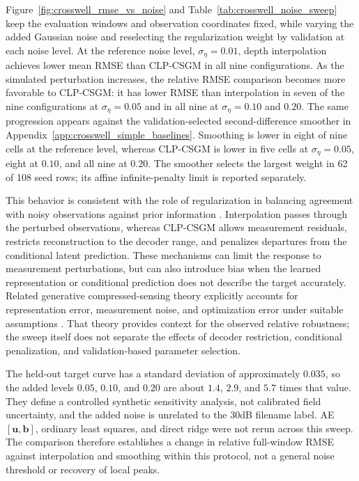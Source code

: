 Figure~\ref{fig:crosswell_rmse_vs_noise} and
Table~\ref{tab:crosswell_noise_sweep} keep the evaluation windows and
observation coordinates fixed, while varying the added Gaussian noise and
reselecting the regularization weight by validation at each noise level.
At the reference noise level, $\sigma_\eta=0.01$, depth interpolation
achieves lower mean RMSE than CLP-CSGM in all nine configurations. As the
simulated perturbation increases, the relative RMSE comparison becomes more
favorable to CLP-CSGM: it has lower RMSE than interpolation in seven of the
nine configurations at $\sigma_\eta=0.05$ and in all nine at
$\sigma_\eta=0.10$ and $0.20$.
The same progression appears against the validation-selected
second-difference smoother in
Appendix~\ref{app:crosswell_simple_baselines}. Smoothing is lower in eight of
nine cells at the reference level, whereas CLP-CSGM is lower in five cells
at $\sigma_\eta=0.05$, eight at $0.10$, and all nine at $0.20$. The
smoother selects the largest weight in 62 of 108 seed rows; its affine
infinite-penalty limit is reported separately.

This behavior is consistent with the role of regularization in balancing
agreement with noisy observations against prior information
\cite{hansen2010discrete}. Interpolation passes through the perturbed
observations, whereas CLP-CSGM allows measurement residuals, restricts
reconstruction to the decoder range, and penalizes departures from the
conditional latent prediction. These mechanisms can limit the response to
measurement perturbations, but can also introduce bias when the learned
representation or conditional prediction does not describe the target
accurately. Related generative compressed-sensing theory explicitly
accounts for representation error, measurement noise, and optimization
error under suitable assumptions \cite{bora2017compressed}. That theory
provides context for the observed relative robustness; the sweep itself does
not separate the effects of decoder restriction, conditional penalization,
and validation-based parameter selection.

The held-out target curve has a standard deviation of approximately $0.035$,
so the added levels $0.05$, $0.10$, and $0.20$ are about $1.4$, $2.9$, and
$5.7$ times that value. They define a controlled synthetic sensitivity
analysis, not calibrated field uncertainty, and the added noise is unrelated
to the 30dB filename label. AE
$[\boldsymbol{u},\boldsymbol{b}]$, ordinary least squares, and direct ridge
were not rerun across this sweep. The comparison therefore establishes a
change in relative full-window RMSE against interpolation and smoothing
within this protocol, not a general noise threshold or recovery of local
peaks.

